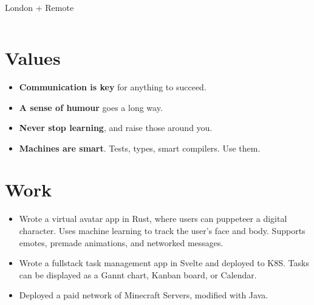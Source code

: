 \documentclass{jcgcv}
\begin{document}
\fontsize{8pt}{1.15em}
\selectfont
{}

\begin{column}


\end{column}\begin{column}

  \fixTop
  \begin{flushright}
    \\
    \\
    London + Remote\\
  \end{flushright}

\end{column}\begin{column}

\section{Values}
  \begin{itemize}
    \item \textbf{Communication is key} for anything to succeed.
    \item \textbf{A sense of humour} goes a long way.
    \item \textbf{Never stop learning}, and raise those around you.
    \item \textbf{Machines are smart}. Tests, types, smart compilers. Use them.
  \end{itemize}

\section{Work}
  \begin{itemize}
    \item Wrote a virtual avatar app in Rust, where users can puppeteer a digital
          character. Uses machine learning to track the user's face and body.
          Supports emotes, premade animations, and networked messages.
    \item Wrote a fullstack task management app in Svelte and deployed to K8S.
          Tasks can be displayed as a Gannt chart, Kanban board, or Calendar.
    \item Deployed a paid network of Minecraft Servers, modified with Java.
  \end{itemize}


\end{column}
\end{document}
